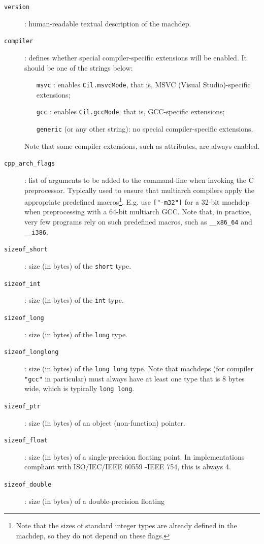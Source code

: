 \begin{description}
\item[\texttt{version}]: human-readable textual description of the machdep.
\item[\texttt{compiler}]: defines whether special compiler-specific extensions
  will be enabled. It should be one of the strings below:
  \begin{itemize}
  \item[\texttt{msvc}]: enables \verb+Cil.msvcMode+, that is,
    MSVC (Visual Studio)-specific extensions;
  \item[\texttt{gcc}]: enables \verb+Cil.gccMode+, that is,
    GCC-specific extensions;
  \item[\texttt{generic}] (or any other string): no special
    compiler-specific extensions.
  \end{itemize}
  Note that some compiler extensions, such as attributes, are always enabled.
\item[\texttt{cpp\_arch\_flags}]: list of arguments to be added to the
  command-line when invoking the C preprocessor. Typically used to ensure that
  multiarch compilers apply the appropriate predefined macros\footnote{Note that
    the sizes of standard integer types are already defined in the machdep,
    so they do not depend on these flags.}.
  E.g. use \verb+["-m32"]+ for a 32-bit machdep when preprocessing with a
  64-bit multiarch GCC.
  Note that, in practice, very few programs rely on such predefined macros,
  such as \verb+__x86_64+ and \verb+__i386+.
  \item[\texttt{sizeof\_short}]: size (in bytes) of the \verb+short+ type.
  \item[\texttt{sizeof\_int}]: size (in bytes) of the \verb+int+ type.
  \item[\texttt{sizeof\_long}]: size (in bytes) of the \verb+long+ type.
  \item[\texttt{sizeof\_longlong}]: size (in bytes) of the \verb+long long+
    type.
    Note that machdeps (for compiler \verb+"gcc"+ in particular) must always
    have at least one type that is 8 bytes wide, which is typically
    \verb+long long+.
  \item[\texttt{sizeof\_ptr}]: size (in bytes) of an object (non-function)
    pointer.
  \item[\texttt{sizeof\_float}]: size (in bytes) of a single-precision floating
    point. In implementations compliant with ISO/IEC/IEEE 60559 -IEEE 754,
    this is always 4.
  \item[\texttt{sizeof\_double}]: size (in bytes) of a double-precision floating

\end{description}
